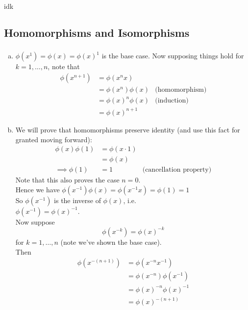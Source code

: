 \documentclass{article}
\newcommand{\inv}[1]{ {#1}^{-1} }
\begin{document}
\subsubsection{}
idk
\subsection{Homomorphisms and Isomorphisms} 
\subsubsection{}\label{ex6p1}
\begin{enumerate}[(a)]
\item $\phi(x^1) = \phi(x) = \phi(x)^1$ is the base case. Now supposing things hold for $k=1,\ldots,n$, note that\\
\begin{align*}
\phi(x^{n+1}) &= \phi(x^nx)\\
&= \phi(x^n)\phi(x) & \mbox{(homomorphism)}\\
&= \phi(x)^n\phi(x) & \mbox{(induction)}\\
&= \phi(x)^{n+1}
\end{align*}
\item
We will prove that homomorphisms preserve identity (and use this fact for granted moving forward):
\begin{align*}
\phi(x)\phi(1) &= \phi(x\cdot 1)\\
&= \phi(x)\\
\implies \phi(1) &= 1 & \mbox{(cancellation property)}
\end{align*}
Note that this also proves the case $n=0$.\\
Hence we have
$\phi(\inv{x})\phi(x) = \phi(\inv{x}x) = \phi(1) = 1$\\
So $\phi(\inv{x})$ is the inverse of $\phi(x)$, i.e.\\
$\phi(\inv{x}) = \inv{\phi(x)}$.\\
Now suppose
\begin{equation*}
\phi(x^{-k}) = \phi(x)^{-k}
\end{equation*}
for $k=1,\ldots,n$ (note we've shown the base case).\\
Then\\
\begin{align*}
\phi(x^{-(n+1)}) &= \phi(x^{-n}\inv{x})\\
&= \phi(x^{-n})\phi(\inv{x})\\
&= \phi(x)^{-n}\inv{\phi(x)}\\
&= \phi(x)^{-(n+1)}
\end{align*}
\end{enumerate}
\end{document}
